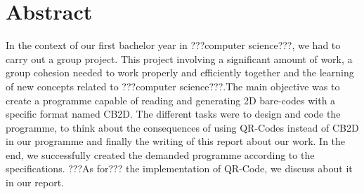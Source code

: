 
\section{Abstract}

%


In the context of our first bachelor year in ???computer science???, we had to carry out a group project. This project involving a significant amount of work, a group cohesion needed to work properly and efficiently together and the learning of new concepts related to ???computer science???.The main objective was to create a programme capable of reading and generating 2D bare-codes with a specific format named CB2D. The different tasks were to design and code the programme, to think about the consequences of using QR-Codes instead of CB2D in our programme and finally the writing of this report about our work. In the end, we successfully created the demanded programme according to the specifications. ???As for??? the implementation of QR-Code, we discuss about it in our report.

